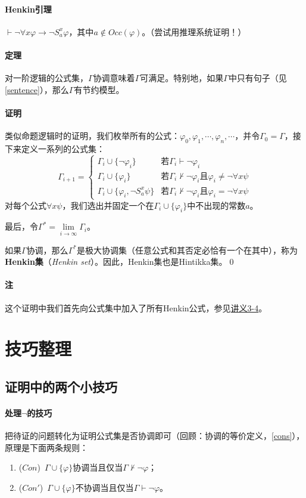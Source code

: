 \documentclass[b5paper,oneside]{ctexbook}
\begin{document}
\paragraph{Henkin引理}$\vdash\neg\forall x\varphi\to\neg S_a^x\varphi$，其中$a\not\in Occ(\varphi)$。（尝试用推理系统证明！）
\paragraph{定理}对一阶逻辑的公式集，$\Gamma$协调意味着$\Gamma$可满足。特别地，如果$\Gamma$中只有句子（见\ref{sentence}），那么$\Gamma$有节约模型。
\paragraph{证明}类似命题逻辑时的证明，我们枚举所有的公式：$\varphi_0,\varphi_1,\cdots ,\varphi_n ,\cdots$，并令$\Gamma_0=\Gamma$，接下来定义一系列的公式集：
\[\Gamma_{i+1}=\begin{cases}
\Gamma_i\cup\{\neg\varphi_i\}&\text{若}\Gamma_i\vdash\neg\varphi_i
\\\Gamma_i\cup\{\varphi_i\}&\text{若}\Gamma_i\not\vdash\neg\varphi_i\text{且}\varphi_i\neq\neg\forall x\psi
\\\Gamma_i\cup\{\varphi_i,\neg S_a^x\psi\}&\text{若}\Gamma_i\not\vdash\neg\varphi_i\text{且}\varphi_i=\neg\forall x\psi
\end{cases}\]
对每个公式$\forall x\psi$，我们选出并固定一个在$\Gamma_i\cup\{\varphi_i\}$中不出现的常数$a$。

最后，令$\Gamma^*=\lim\limits_{i\to\infty}\Gamma_i$。

如果$\Gamma$协调，那么$\Gamma^*$是极大协调集（任意公式和其否定必恰有一个在其中），称为\textbf{Henkin集}（\textit{Henkin set}）。因此，Henkin集也是Hintikka集。\hfill\qed
\paragraph{注}这个证明中我们首先向公式集中加入了所有Henkin公式，参见\href{http://iscasmc.ios.ac.cn/DM2016/annotated3-4.pdf}{讲义3-4}。
\section{技巧整理}
\subsection{证明中的两个小技巧}
\paragraph{处理$\neg$的技巧}把待证的问题转化为证明公式集是否协调即可（回顾：协调的等价定义，\ref{cons}），原理是下面两条规则：
\begin{enumerate}
\item ($Con$)~$\Gamma\cup\{\varphi\}$协调当且仅当$\Gamma\not\vdash\neg\varphi$；
\item ($Con'$)~$\Gamma\cup\{\varphi\}$不协调当且仅当$\Gamma\vdash\neg\varphi$。
\end{enumerate}
\end{document}
